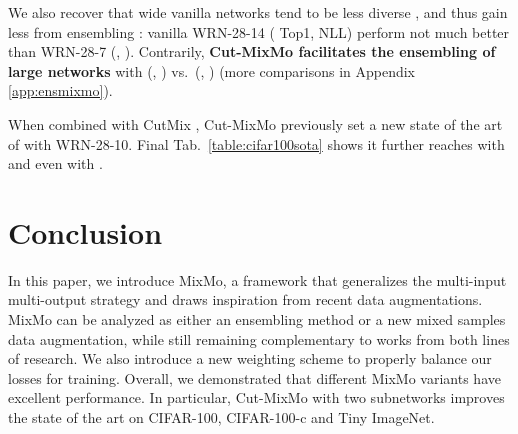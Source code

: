 \documentclass[10pt,twocolumn,letterpaper]{article}
\begin{document}
We also recover that wide vanilla networks tend to be less diverse
\cite{neal2018modern}, and thus gain less from ensembling \cite{lobacheva2020power}:  vanilla
WRN-28-14 ( Top1,  NLL) perform not much better than
 WRN-28-7 (, ). Contrarily,
\textbf{Cut-MixMo facilitates the ensembling of large networks} with
(, )  vs.\ (, ) (more comparisons in Appendix \ref{app:ensmixmo}).

When combined with CutMix \cite{yun2019cutmix}, Cut-MixMo previously set a new state of the art of  with  WRN-28-10. Final Tab.~\ref{table:cifar100sota} shows it further reaches  with  and even  with .
\begin{table}[H]
\caption{\textbf{Best results for WRN-28-10 on CIFAR-100} via Cut-MixMo + CutMix \cite{yun2019cutmix} + -ensembling and .\linebreak Recent Top1 SoTAs: 85.23 \cite{qin2020resizemix}, 85.51 \cite{yang2020radaug}, 85.74 \cite{zhao2020plitnet}.}\centering
{}
\label{table:cifar100sota}
\end{table}


 \section{Conclusion}In this paper, we introduce MixMo, a framework that generalizes the multi-input multi-output strategy and draws inspiration from recent data augmentations.
MixMo can be analyzed as either an ensembling method or a new mixed samples data
augmentation, while still remaining complementary to works from both lines of
research. We also introduce a new weighting scheme to properly balance our losses for training.
Overall, we demonstrated that different MixMo variants have excellent performance.
In particular, Cut-MixMo with two subnetworks improves the state of the art on CIFAR-100,
CIFAR-100-c and Tiny ImageNet.
\end{document}
